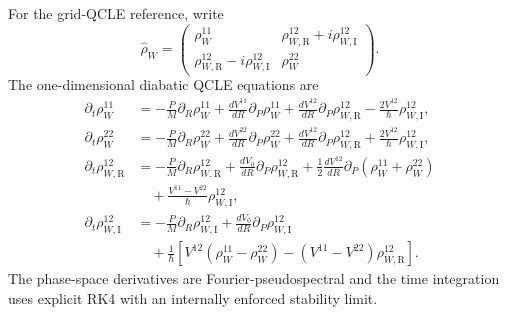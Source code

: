 \documentclass[
  11pt,
  letterpaper,
  onehalfspacing,
  normalmargins,
  equalmargins,
  oneside
]{ut-thesis}
\begin{document}
For the grid-QCLE reference, write
\[
\hat\rho_W
=
\begin{pmatrix}
\rho_W^{11}
&
\rho_{W,\mathrm R}^{12}
+
i\rho_{W,\mathrm I}^{12}
\\
\rho_{W,\mathrm R}^{12}
-
i\rho_{W,\mathrm I}^{12}
&
\rho_W^{22}
\end{pmatrix}.
\]
The one-dimensional diabatic QCLE equations are
\begin{align}
\partial_t\rho_W^{11}
&=
-\frac{P}{M}\partial_R\rho_W^{11}
+
\frac{dV^{11}}{dR}
\partial_P\rho_W^{11}
+
\frac{dV^{12}}{dR}
\partial_P\rho_{W,\mathrm R}^{12}
-
\frac{2V^{12}}{\hbar}
\rho_{W,\mathrm I}^{12},
\\
\partial_t\rho_W^{22}
&=
-\frac{P}{M}\partial_R\rho_W^{22}
+
\frac{dV^{22}}{dR}
\partial_P\rho_W^{22}
+
\frac{dV^{12}}{dR}
\partial_P\rho_{W,\mathrm R}^{12}
+
\frac{2V^{12}}{\hbar}
\rho_{W,\mathrm I}^{12},
\\
\partial_t\rho_{W,\mathrm R}^{12}
&=
-\frac{P}{M}\partial_R\rho_{W,\mathrm R}^{12}
+
\frac{dV_0}{dR}
\partial_P\rho_{W,\mathrm R}^{12}
+
\frac{1}{2}
\frac{dV^{12}}{dR}
\partial_P
\left(
\rho_W^{11}+\rho_W^{22}
\right)
\nonumber\\
&\quad
+
\frac{
V^{11}-V^{22}
}{
\hbar
}
\rho_{W,\mathrm I}^{12},
\\
\partial_t\rho_{W,\mathrm I}^{12}
&=
-\frac{P}{M}\partial_R\rho_{W,\mathrm I}^{12}
+
\frac{dV_0}{dR}
\partial_P\rho_{W,\mathrm I}^{12}
\nonumber\\
&\quad
+
\frac{1}{\hbar}
\left[
V^{12}
\left(
\rho_W^{11}-\rho_W^{22}
\right)
-
\left(
V^{11}-V^{22}
\right)
\rho_{W,\mathrm R}^{12}
\right].
\label{appeq:grid-qcle-components}
\end{align}
The phase-space derivatives are Fourier-pseudospectral and the time
integration uses explicit RK4 with an internally enforced stability limit.
\end{document}
